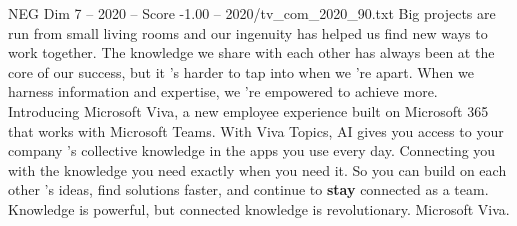 \begin{textsample}{NEG Dim 7 – 2020 – Score -1.00 – 2020/tv\_com\_2020\_90.txt}  \label{ex:f7_neg_007}
Big projects are run from small living rooms and our ingenuity has helped us find new ways to work together.
The knowledge we share with each other has always been at the core of our success, but it 's harder to tap into when we 're apart.
When we harness information and expertise, we 're empowered to achieve more.
Introducing Microsoft Viva, a new employee experience built on Microsoft 365 that works with Microsoft Teams.
With Viva Topics, AI gives you access to your company 's collective knowledge in the apps you use every day.
Connecting you with the knowledge you need exactly when you need it.
So you can build on each other 's ideas, find solutions faster, and continue to \textbf{stay} connected as a team.
Knowledge is powerful, but connected knowledge is revolutionary.
Microsoft Viva.

\end{textsample}
